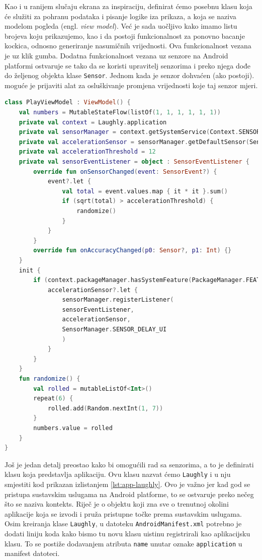 \documentclass[11pt,a4paper,twoside]{article}
\begin{document}
Kao i u ranijem slučaju ekrana za inspiraciju, definirat ćemo posebnu klasu koja će služiti za pohranu podataka i pisanje logike iza prikaza, a koja se naziva modelom pogleda (engl. \textit{view model}). Već je sada uočljivo kako imamo listu brojeva koju prikazujemo, kao i da postoji funkcionalnost za ponovno bacanje kockica, odnosno generiranje nasumičnih vrijednosti. Ova funkcionalnost vezana je uz klik gumba. Dodatna funkcionalnost vezana uz senzore na Android platformi ostvaruje se tako da se koristi upravitelj senzorima i preko njega dođe do željenog objekta klase \texttt{Sensor}. Jednom kada je senzor dohvaćen (ako postoji). moguće je prijaviti alat za osluškivanje promjena vrijednosti koje taj senzor mjeri.

\begin{lstlisting}[caption={Model pogleda za igru - PlayViewModel.kt}, label={lst:viewmodel-play}, language=Kotlin]
class PlayViewModel : ViewModel() {
	val numbers = MutableStateFlow(listOf(1, 1, 1, 1, 1, 1))
	private val context = Laughly.application
	private val sensorManager = context.getSystemService(Context.SENSOR_SERVICE) as SensorManager
	private val accelerationSensor = sensorManager.getDefaultSensor(Sensor.TYPE_ACCELEROMETER)
	private val accelerationThreshold = 12
	private val sensorEventListener = object : SensorEventListener {
		override fun onSensorChanged(event: SensorEvent?) {
			event?.let {
				val total = event.values.map { it * it }.sum()
				if (sqrt(total) > accelerationThreshold) {
					randomize()
				}
			}
		}
		override fun onAccuracyChanged(p0: Sensor?, p1: Int) {}
	}
	init {
		if (context.packageManager.hasSystemFeature(PackageManager.FEATURE_SENSOR_ACCELEROMETER)) {
			accelerationSensor?.let {
				sensorManager.registerListener(
				sensorEventListener,
				accelerationSensor,
				SensorManager.SENSOR_DELAY_UI
				)
			}
		}
	}
	fun randomize() {
		val rolled = mutableListOf<Int>()
		repeat(6) {
			rolled.add(Random.nextInt(1, 7))
		}
		numbers.value = rolled
	}
}
\end{lstlisting}

Još je jedan detalj preostao kako bi omogućili rad sa senzorima, a to je definirati klasu koja predstavlja aplikaciju. Ovu klasu nazvat ćemo \texttt{Laughly} i u nju smjestiti kod prikazan izlistanjem \ref{lst:app-laughly}. Ovo je važno jer kad god se pristupa sustavskim uslugama na Android platforme, to se ostvaruje preko nečeg što se naziva kontekts. Riječ je o objektu koji zna sve o trenutnoj okolini aplikacije koja se izvodi i pruža pristupne točke prema sustavskim uslugama. Osim kreiranja klase \texttt{Laughly}, u datoteku \texttt{AndroidManifest.xml} potrebno je dodati liniju koda kako bismo tu novu klasu uistinu registrirali kao aplikacijsku klasu. To se postiže dodavanjem atributa \texttt{name} unutar oznake \texttt{application} u manifest datoteci.
\end{document}

